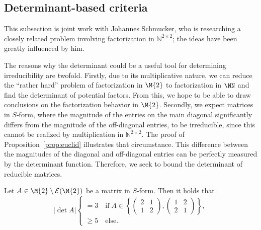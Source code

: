 \subsection{Determinant-based criteria}
This subsection is joint work with Johannes Schmucker, who is researching a closely related problem involving factorization in $\mathbb{N}^{2\times 2}$; the ideas have been greatly influenced by him.

The reasons why the determinant could be a useful tool for determining irreducibility are twofold. Firstly, due to its multiplicative nature, we can reduce the ``rather hard'' problem of factorization in $\M{2}$ to factorization in $\NN$ and find the determinant of potential factors. From this, we hope to be able to draw conclusions on the factorization behavior in $\M{2}$. Secondly, we expect matrices in $S$-form, where the magnitude of the entries on the main diagonal significantly differs from the magnitude of the off-diagonal entries, to be irreducible, since this cannot be realized by multiplication in $\mathbb{N}^{2 \times 2}$. The proof of Proposition~\ref{prop:euclid} illustrates that circumstance. This difference between the magnitudes of the diagonal and off-diagonal entries can be perfectly measured by the determinant function. Therefore, we seek to bound the determinant of reducible matrices.

\begin{proposition}\label{prop:det-s-form}
Let $A \in \M{2}\setminus\mathcal{E}(\M{2})$ be a matrix in $S$-form. Then it holds that
\[ \left\lvert \det{A}\right\rvert \begin{cases} = 3 \quad \text{if}\;A \in \left\{ \begin{pmatrix} 2 & 1 \\ 1 & 2 \end{pmatrix}, \begin{pmatrix} 1 & 2 \\ 2 & 1 \end{pmatrix} \right\}, \\ \geq 5 \quad \text{else}. \end{cases} \]
\end{proposition}

